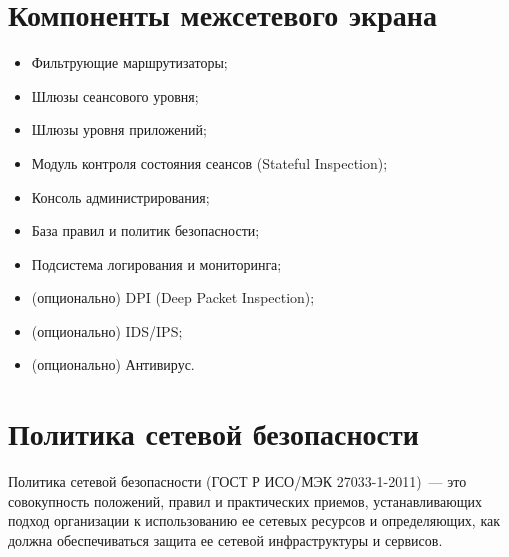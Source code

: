 	\newpage
	
	\section{Компоненты межсетевого экрана}
	
	\begin{itemize}
		\item Фильтрующие маршрутизаторы;
		\item Шлюзы сеансового уровня;
		\item Шлюзы уровня приложений;
		\item Модуль контроля состояния сеансов (Stateful Inspection);
		\item Консоль администрирования;
		\item База правил и политик безопасности;
		\item Подсистема логирования и мониторинга;
		\item (опционально) DPI (Deep Packet Inspection);
		\item (опционально) IDS/IPS;
		\item (опционально) Антивирус.
	\end{itemize}
	
	\newpage
	
	\section{Политика сетевой безопасности}
	Политика сетевой безопасности (ГОСТ Р ИСО/МЭК 27033-1-2011)~--- это совокупность положений, правил и практических приемов, устанавливающих подход организации к использованию ее сетевых ресурсов и определяющих, как должна обеспечиваться защита ее сетевой инфраструктуры и сервисов.
	

